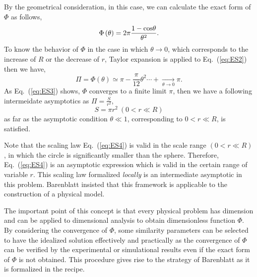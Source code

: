 \documentclass[aps,prl,superscriptaddress]{revtex4}  %
\begin{document}
By the geometrical consideration, in this case, we can calculate the exact form of $\Phi$ as follows,
%
\begin{equation}
\Phi\left(\theta\right) =2\pi \frac{1- {\rm cos} \theta}{\theta^2}.
\label{eq:ES2}
\end{equation}
%
To know the behavior of $\Phi$ in the case in which $\theta \rightarrow 0$, which corresponds to the increase of $R$ or the decrease of $r$, Taylor expansion is applied to Eq.~(\ref{eq:ES2}) then we have,
%
\begin{equation}
\Pi =\Phi\left(\theta\right) \simeq \pi -\frac{\pi}{12}\theta^2 \cdots +\underset{\theta \rightarrow 0}{\longrightarrow} \pi.
\label{eq:ES3}
\end{equation}
%
As Eq.~(\ref{eq:ES3}) shows, $\Phi$ converges to a finite limit $\pi$, then we have a following intermeidate asymptotics as $\Pi = \frac{S}{r^2}$,
%
\begin{equation}
S = \pi r^2~\left(0 < r \ll R\right)
\label{eq:ES4}
\end{equation}
%
as far as the asymptotic condition $\theta \ll 1$, corresponding to $0 < r \ll R$, is satisfied.

Note that the scaling law Eq.~(\ref{eq:ES4}) is valid in the scale range  $(0 < r \ll R)$, in which the circle is significantly smaller than the sphere. Therefore, Eq.~(\ref{eq:ES4}) is an asymptotic expression which is valid in the certain range of variable $r$. This scaling law formalized {\it locally} is an intermediate asymptotic in this problem. Barenblatt insisted that this framework is applicable to the construction of a physical model.

The important point of this concept is that every physical problem has dimension and can be applied to dimensional analysis to obtain dimensionless function $\Phi$. By considering the convergence of $\Phi$, some similarity parameters can be selected to have the idealized solution effectively and practically as the convergence of $\Phi$ can be verified by the experimental or simulational results even if the exact form of $\Phi$ is not obtained. This procedure gives rise to the strategy of Barenblatt as it is formalized in the recipe\cite{Recipe}.
\end{document}
